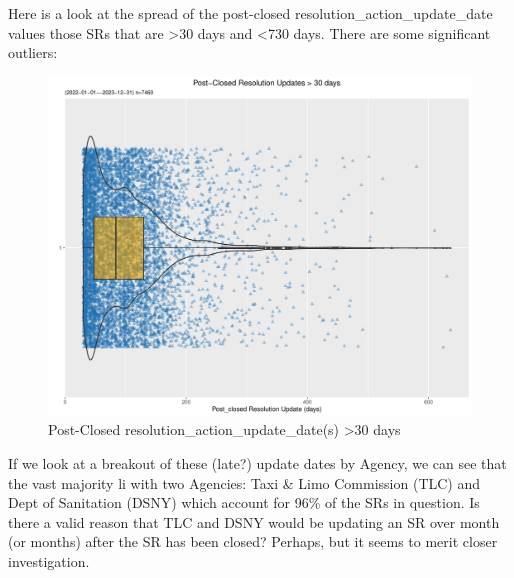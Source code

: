 \documentclass[12pt, titlepage]{article}
\begin{document}
	Here is a look at the spread of the post-closed resolution\_action\_update\_date 
	values those SRs 	that are \textgreater30 days and \textless{}730 days. 
	There are some significant outliers: 
	
	\begin{figure}[tbp]
		\centering
		\includegraphics[width = \textwidth]{post_closed_violin.pdf}
		\caption{Post-Closed resolution\_action\_update\_date(s) 
		\textgreater30 days}
		\label{fig:resolution-violin}
	\end{figure}		

	If we look at a breakout of these (late?) update dates by Agency, 
	we can see that the vast majority li with two Agencies: Taxi \& Limo 
	Commission (TLC) and Dept of Sanitation (DSNY) which account 
	for 96\% of the SRs in question.  Is there a valid reason that TLC and 
	DSNY would be updating an SR over month (or months) after 
	the SR has been closed? Perhaps, but it seems to merit closer investigation. 
\end{document}
